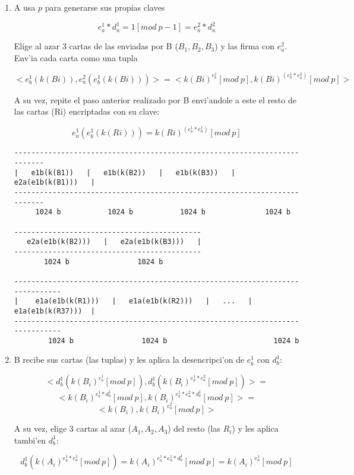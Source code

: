 \begin{enumerate}
  


\item A usa $p$ para generarse sus propias claves

$$	e^1_a * d^1_a = 1 [mod\ p-1] = e^2_a * d^2_a $$

Elige al azar 3 cartas de las enviadas por B ($B_1, B_2, B_3$) y las firma con $e^2_a$. Env'ia cada carta como una tupla

$$	<e^1_b(k(Bi)), 			e^2_a(e^1_b(k(Bi)))> = 
	<k(Bi)^{e^1_b} [mod\ p], 	k(Bi)^(e^1_b * e^2_a) [mod\ p]> $$
	
A su vez, repite el paso anterior realizado por B envi'andole a este el resto de las cartas (Ri) encriptadas con su clave:

$$	e^1_a(e^1_b(k(Ri))) = k(Ri)^(e^1_b * e^1_a) [mod\ p] $$
	

\begin{verbatim}
--------------------------------------------------------------------------
|   e1b(k(B1))   |   e1b(k(B2))   |   e1b(k(B3))   |   e2a(e1b(k(B1)))   |
--------------------------------------------------------------------------
     1024 b           1024 b           1024 b              1024 b         

--------------------------------------------
   e2a(e1b(k(B2)))   |   e2a(e1b(k(B3)))   |
--------------------------------------------
       1024 b                1024 b         

------------------------------------------------------------------------------
|    e1a(e1b(k(R1)))   |   e1a(e1b(k(R2)))   |   ...   |   e1a(e1b(k(R37)))  |
------------------------------------------------------------------------------
        1024 b                1024 b                         1024 b           
\end{verbatim}
	
	
	
	
	
\item B recibe sus cartas (las tuplas) y les aplica la desencripci'on de $e^1_b$ con $d^1_b$:

$$	<d^1_b(k(B_i)^{e^1_b} [mod\ p]), 		d^1_b(k(B_i)^{e^1_b * e^2_a} [mod\ p])> = $$
$$	<k(B_i)^{e^1_b * d^1_b} [mod\ p], 	k(B_i)^{e^1_b * e^2_a * d^1_b} [mod\ p]> = $$
$$	<k(B_i), 						k(B_i)^{e^2_a} [mod\ p]> $$

A su vez, elige 3 cartas al azar ($A_1, A_2, A_3$) del resto (las $R_i$) y les aplica tambi'en $d^1_b$:
	
$$	d^1_b(k(A_i)^{e^1_b * e^1_a} [mod\ p]) = 
	k(A_i)^{e^1_b * e^1_a * d^1_b} [mod\ p] =
	k(A_i)^{e^1_a} [mod\ p] $$


\end{enumerate}

